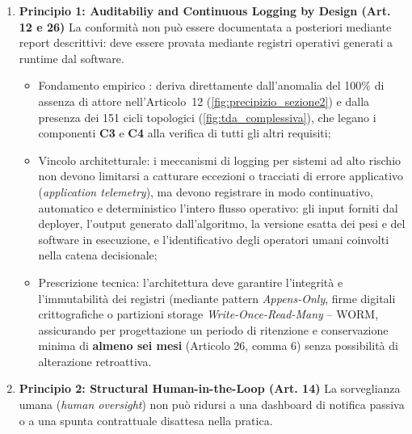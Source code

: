 \documentclass[12pt,a4paper,oneside]{report}
\begin{document}
\begin{enumerate}
    \item \textbf{Principio 1: Auditabiliy and Continuous Logging by Design (Art. 12 e 26)}
    La conformità non può essere documentata a posteriori mediante report descrittivi: deve essere provata mediante registri operativi generati a runtime dal software.
    \begin{itemize}
        \item Fondamento empirico : deriva direttamente dall'anomalia del 100\% di assenza di attore nell'Articolo~12 (\cref{fig:precipizio_sezione2}) e dalla presenza dei 151 cicli topologici (\cref{fig:tda_complessiva}), che legano i componenti \textbf{C3} e \textbf{C4} alla verifica di tutti gli altri requisiti;
        \item Vincolo architetturale: i meccanismi di logging per sistemi ad alto rischio non devono limitarsi a catturare eccezioni o tracciati di errore applicativo (\emph{application telemetry}), ma devono registrare in modo continuativo, automatico e deterministico l'intero flusso operativo: gli input forniti dal deployer, l'output generato dall'algoritmo, la versione esatta dei pesi e del software in esecuzione, e l'identificativo degli operatori umani coinvolti nella catena decisionale;
        \item Prescrizione tecnica: l'architettura deve garantire l'integrità e l'immutabilità dei registri (mediante pattern \emph{Appens-Only}, firme digitali crittografiche o partizioni storage \emph{Write-Once-Read-Many }-- WORM, assicurando per progettazione un periodo di ritenzione e conservazione minima di \textbf{almeno sei mesi} (Articolo 26, comma 6) senza possibilità di alterazione retroattiva.
    \end{itemize}
    \item \textbf{Principio 2: Structural Human-in-the-Loop (Art. 14)}
    La sorveglianza umana (\emph{human oversight}) non può ridursi a una dashboard di notifica passiva o a una spunta contrattuale disattesa nella pratica.


\end{enumerate}
\end{document}
